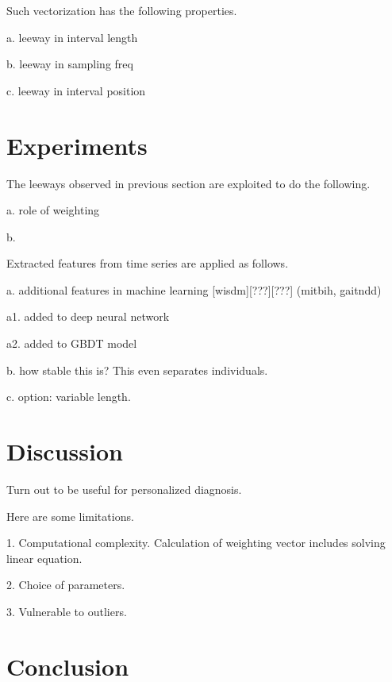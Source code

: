 \documentclass{article}
\begin{document}
Such vectorization has the following properties.

a. leeway in interval length

b. leeway in sampling freq

c. leeway in interval position

\section{Experiments}
The leeways observed in previous section are exploited to do the following.

a. role of weighting

b. 

Extracted features from time series are applied as follows.

a. additional features in machine learning [wisdm][???][???] (mitbih, gaitndd)

a1. added to deep neural network

a2. added to GBDT model

b. how stable this is? This even separates individuals.

c. option: variable length.
\cite{wisdm} \cite{wrist.ppg}

\section{Discussion}
Turn out to be useful for personalized diagnosis.

Here are some limitations.

1. Computational complexity. Calculation of weighting vector includes solving linear equation.

2. Choice of parameters.

3. Vulnerable to outliers.

\section{Conclusion}



\end{document}
